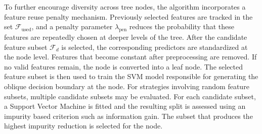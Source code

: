 To further encourage diversity across tree nodes, the algorithm incorporates a feature reuse penalty mechanism. Previously selected features are tracked in the set \(\mathcal{F}_{\text{used}}\), and a penalty parameter \(\lambda_{\text{pen}}\) reduces the probability that these features are repeatedly chosen at deeper levels of the tree. After the candidate feature subset \(\mathcal{F}_d\) is selected, the corresponding predictors are standardized at the node level. Features that become constant after preprocessing are removed. If no valid features remain, the node is converted into a leaf node. The selected feature subset is then used to train the SVM model responsible for generating the oblique decision boundary at the node. For strategies involving random feature subsets, multiple candidate subsets may be evaluated. For each candidate subset, a Support Vector Machine is fitted and the resulting split is assessed using an impurity based criterion such as information gain. The subset that produces the highest impurity reduction is selected for the node.

